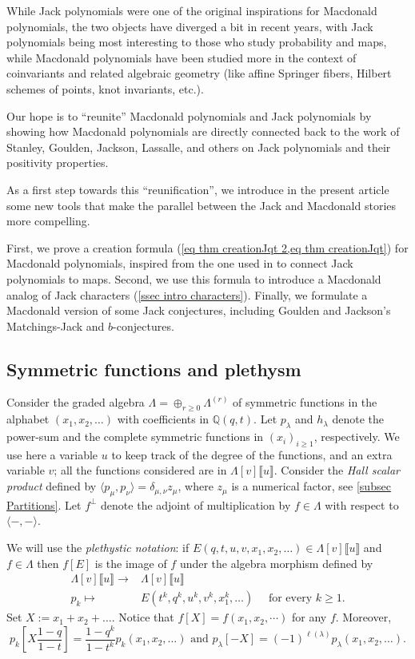 \documentclass[12pt]{amsart}
\theoremstyle{remark}
\begin{document}
While Jack polynomials were one of the original inspirations for Macdonald polynomials, the two objects have diverged a bit in recent years, with Jack polynomials being most interesting to those who study probability and maps, while Macdonald polynomials have been studied more in the context of coinvariants and related algebraic geometry (like affine Springer fibers, Hilbert schemes of points, knot invariants, etc.).

Our hope is to ``reunite'' Macdonald polynomials and Jack polynomials by showing how Macdonald polynomials are directly connected back to the work of Stanley, Goulden, Jackson, Lassalle, and others on Jack polynomials and their positivity properties. 

As a first step towards this ``reunification'', we introduce in the present article some new tools that make the parallel between the Jack and Macdonald stories more compelling.

First, we prove a creation formula (\cref{eq thm creationJqt 2,eq thm creationJqt}) for Macdonald polynomials, inspired from the one used in \cite{BenDaliDolega2023} to connect Jack polynomials to maps. Second, we use this formula to introduce a Macdonald analog of Jack characters (\cref{ssec intro characters}). Finally, we formulate a Macdonald version of some Jack conjectures, including Goulden and Jackson's Matchings-Jack and $b$-conjectures.

\subsection{Symmetric functions and plethysm}\label{ssec plethysm}

Consider the graded algebra $\Lambda=\oplus_{r\geq 0}\Lambda^{(r)}$ of symmetric functions in the alphabet $(x_1,x_2,\dots)$ with coefficients in $\mathbb{Q}(q,t)$. Let $p_\lambda$ and $h_\lambda$ denote  the power-sum and the complete symmetric functions in $(x_i)_{i\geq 1}$, respectively.
We use here a variable  $u$ to keep track of the degree of the functions, and an extra variable $v$; all the functions considered are in $\Lambda[v]\llbracket u\rrbracket$. Consider the \emph{Hall scalar product} defined by $\langle p_\mu,p_\nu\rangle =\delta_{\mu,\nu} z_\mu$, where $z_\mu$ is a numerical factor, see \cref{subsec Partitions}.
Let $f^\perp$ denote the adjoint of multiplication by $f\in \Lambda$ with respect to $\langle -, -\rangle$. 

We will use the \textit{plethystic notation}: if $E(q,t,u,v,x_1,x_2,\dots)\in\Lambda[v]\llbracket u\rrbracket$ and $f\in\Lambda$ then $f[E]$ is the image of $f$ under the algebra morphism defined by
\begin{align*}
 \Lambda[v]\llbracket u\rrbracket\longrightarrow &\Lambda[v]\llbracket u\rrbracket\\
  p_k\longmapsto &E(t^k,q^k,u^k,v^k,x_1^k,\dots)\quad \text{ for every }k\geq 1.  
\end{align*}
Set $X:=x_1+x_2+\dots$. Notice that $f[X]=f(x_1,x_2,\cdots)$ for any $f$.
Moreover, 
$$p_k\left[X\frac{1-q}{1-t}\right]=\frac{1-q^k}{1-t^k}p_k(x_1,x_2,\dots)\text{ and }p_\lambda[-X]=(-1)^{\ell(\lambda)}p_\lambda(x_1,x_2,\dots).$$
\end{document}
